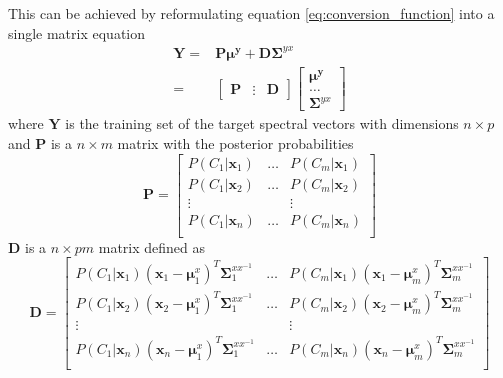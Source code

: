 This can be achieved by reformulating equation \eqref{eq:conversion_function} into a single matrix equation
\begin{equation}
	\label{eq:least_square_problem}
	\begin{split}
		\mathbf{Y} = &\mathbf{P}\boldsymbol{\mu^y} + \mathbf{D}\mathbf{\Sigma}^{yx} \\
		= & \begin{bmatrix}
			\mathbf{P}& \vdots &\mathbf{D}
		\end{bmatrix}
		\begin{bmatrix}
			\boldsymbol{\mu^y} \\
			\dots \\
			\mathbf{\Sigma}^{yx}
		\end{bmatrix}
	\end{split}
\end{equation}
where $\mathbf{Y}$ is the training set of the target spectral vectors with dimensions $n\times p$ and $\mathbf{P}$ is a $n \times m$ matrix with the posterior probabilities
\begin{equation}
	\label{eq:P_matrix}
	\mathbf{P} = \begin{bmatrix}
		P(C_1\vert \mathbf{x}_1) & \dots & P(C_m\vert \mathbf{x}_1) \\
		P(C_1\vert \mathbf{x}_2) & \dots & P(C_m\vert \mathbf{x}_2) \\
		\vdots & & \vdots \\
		P(C_1\vert \mathbf{x}_n) & \dots & P(C_m\vert \mathbf{x}_n) \\
	\end{bmatrix}
\end{equation}
$\mathbf{D}$ is a $n \times pm$ matrix defined as
\begin{equation}
	\label{eq:D_matrix}
	\mathbf{D} = \begin{bmatrix}
		P(C_1\vert \mathbf{x}_1)(\mathbf{x}_1 - \boldsymbol{\mu}_1^x)^T\mathbf{\Sigma}_1^{xx^{-1}} & \dots & P(C_m\vert \mathbf{x}_1)(\mathbf{x}_1 - \boldsymbol{\mu}_m^x)^T\mathbf{\Sigma}_m^{xx^{-1}} \\
		P(C_1\vert \mathbf{x}_2)(\mathbf{x}_2 - \boldsymbol{\mu}_1^x)^T\mathbf{\Sigma}_1^{xx^{-1}} & \dots & P(C_m\vert \mathbf{x}_2)(\mathbf{x}_2 - \boldsymbol{\mu}_m^x)^T\mathbf{\Sigma}_m^{xx^{-1}} \\
		\vdots & & \vdots \\
		P(C_1\vert \mathbf{x}_n)(\mathbf{x}_n - \boldsymbol{\mu}_1^x)^T\mathbf{\Sigma}_1^{xx^{-1}} & \dots & P(C_m\vert \mathbf{x}_n)(\mathbf{x}_n - \boldsymbol{\mu}_m^x)^T\mathbf{\Sigma}_m^{xx^{-1}} \\
	\end{bmatrix}
\end{equation}

